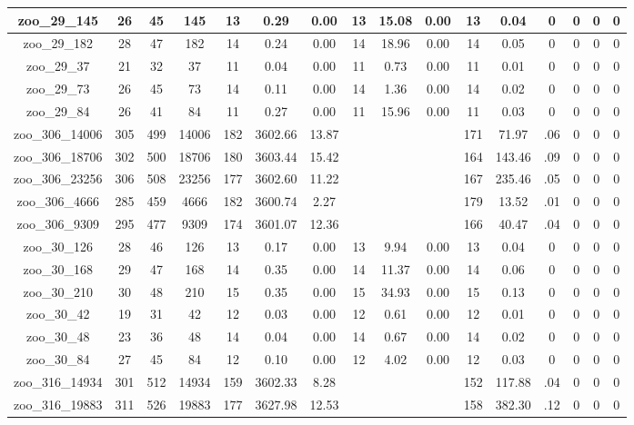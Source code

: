 \begin{landscape}
\begin{longtable}{|c|c|c|c|c|c|c|c|c|c|c|c|c|c|c|c|}
zoo\_29\_145 & 26 & 45 & 145 & 13 & 0.29 & 0.00 & 13 & 15.08 & 0.00 & 13 & 0.04 & 0 & 0 & 0 & 0 \\ \hline 
zoo\_29\_182 & 28 & 47 & 182 & 14 & 0.24 & 0.00 & 14 & 18.96 & 0.00 & 14 & 0.05 & 0 & 0 & 0 & 0 \\ \hline 
zoo\_29\_37 & 21 & 32 & 37 & 11 & 0.04 & 0.00 & 11 & 0.73 & 0.00 & 11 & 0.01 & 0 & 0 & 0 & 0 \\ \hline 
zoo\_29\_73 & 26 & 45 & 73 & 14 & 0.11 & 0.00 & 14 & 1.36 & 0.00 & 14 & 0.02 & 0 & 0 & 0 & 0 \\ \hline 
zoo\_29\_84 & 26 & 41 & 84 & 11 & 0.27 & 0.00 & 11 & 15.96 & 0.00 & 11 & 0.03 & 0 & 0 & 0 & 0 \\ \hline 
zoo\_306\_14006 & 305 & 499 & 14006 & 182 & 3602.66 & 13.87 &  &  &  & 171 & 71.97 & .06 & 0 & 0 & 0 \\ \hline 
zoo\_306\_18706 & 302 & 500 & 18706 & 180 & 3603.44 & 15.42 &  &  &  & 164 & 143.46 & .09 & 0 & 0 & 0 \\ \hline 
zoo\_306\_23256 & 306 & 508 & 23256 & 177 & 3602.60 & 11.22 &  &  &  & 167 & 235.46 & .05 & 0 & 0 & 0 \\ \hline 
zoo\_306\_4666 & 285 & 459 & 4666 & 182 & 3600.74 & 2.27 &  &  &  & 179 & 13.52 & .01 & 0 & 0 & 0 \\ \hline 
zoo\_306\_9309 & 295 & 477 & 9309 & 174 & 3601.07 & 12.36 &  &  &  & 166 & 40.47 & .04 & 0 & 0 & 0 \\ \hline 
zoo\_30\_126 & 28 & 46 & 126 & 13 & 0.17 & 0.00 & 13 & 9.94 & 0.00 & 13 & 0.04 & 0 & 0 & 0 & 0 \\ \hline 
zoo\_30\_168 & 29 & 47 & 168 & 14 & 0.35 & 0.00 & 14 & 11.37 & 0.00 & 14 & 0.06 & 0 & 0 & 0 & 0 \\ \hline 
zoo\_30\_210 & 30 & 48 & 210 & 15 & 0.35 & 0.00 & 15 & 34.93 & 0.00 & 15 & 0.13 & 0 & 0 & 0 & 0 \\ \hline 
zoo\_30\_42 & 19 & 31 & 42 & 12 & 0.03 & 0.00 & 12 & 0.61 & 0.00 & 12 & 0.01 & 0 & 0 & 0 & 0 \\ \hline 
zoo\_30\_48 & 23 & 36 & 48 & 14 & 0.04 & 0.00 & 14 & 0.67 & 0.00 & 14 & 0.02 & 0 & 0 & 0 & 0 \\ \hline 
zoo\_30\_84 & 27 & 45 & 84 & 12 & 0.10 & 0.00 & 12 & 4.02 & 0.00 & 12 & 0.03 & 0 & 0 & 0 & 0 \\ \hline 
zoo\_316\_14934 & 301 & 512 & 14934 & 159 & 3602.33 & 8.28 &  &  &  & 152 & 117.88 & .04 & 0 & 0 & 0 \\ \hline 
zoo\_316\_19883 & 311 & 526 & 19883 & 177 & 3627.98 & 12.53 &  &  &  & 158 & 382.30 & .12 & 0 & 0 & 0 \\ \hline 

\end{longtable}
\end{landscape}
